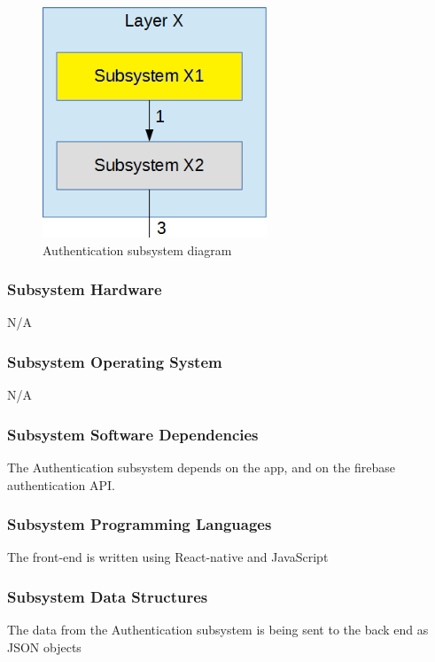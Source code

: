 \begin{figure}[h!]
	\centering
 	\includegraphics[width=0.60\textwidth]{images/subsystem} %
 \caption{Authentication subsystem diagram} %
\end{figure}

\subsubsection{Subsystem Hardware}
N/A

\subsubsection{Subsystem Operating System}
N/A

\subsubsection{Subsystem Software Dependencies}
The Authentication subsystem depends on the app, and on the firebase authentication API.

\subsubsection{Subsystem Programming Languages}
The front-end is written using React-native and JavaScript 

\subsubsection{Subsystem Data Structures}
The data from the Authentication subsystem is being sent to the back end as JSON objects

